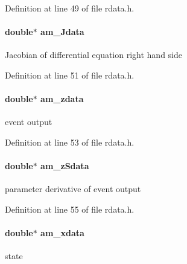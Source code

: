 Definition at line 49 of file rdata.\+h.

\hypertarget{struct_return_data_a82d71415ca06c969ebd22a02e4789b1d}{}
\paragraph[{am\+\_\+\+Jdata}]{\setlength{\rightskip}{0pt plus 5cm}double$\ast$ am\+\_\+\+Jdata}\label{struct_return_data_a82d71415ca06c969ebd22a02e4789b1d}
Jacobian of differential equation right hand side 

Definition at line 51 of file rdata.\+h.

\hypertarget{struct_return_data_ab9982c7bbb81e3d54ab0a2f8b6e1ccec}{}
\paragraph[{am\+\_\+zdata}]{\setlength{\rightskip}{0pt plus 5cm}double$\ast$ am\+\_\+zdata}\label{struct_return_data_ab9982c7bbb81e3d54ab0a2f8b6e1ccec}
event output 

Definition at line 53 of file rdata.\+h.

\hypertarget{struct_return_data_a7da81862a5c66dcc9da19fbf34b1bae3}{}
\paragraph[{am\+\_\+z\+Sdata}]{\setlength{\rightskip}{0pt plus 5cm}double$\ast$ am\+\_\+z\+Sdata}\label{struct_return_data_a7da81862a5c66dcc9da19fbf34b1bae3}
parameter derivative of event output 

Definition at line 55 of file rdata.\+h.

\hypertarget{struct_return_data_ad99b08eb835733c2416a1a0004e4a491}{}
\paragraph[{am\+\_\+xdata}]{\setlength{\rightskip}{0pt plus 5cm}double$\ast$ am\+\_\+xdata}\label{struct_return_data_ad99b08eb835733c2416a1a0004e4a491}
state 


